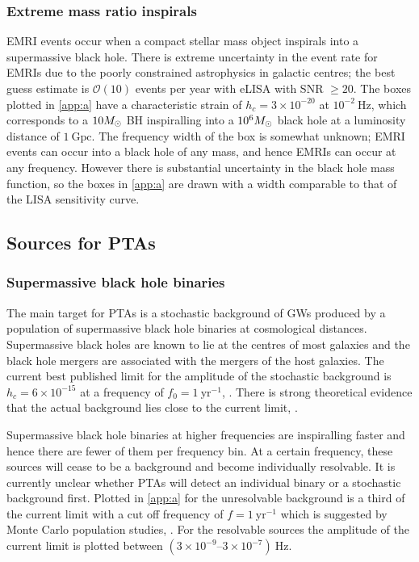 {\subsubsection{Extreme mass ratio inspirals}
EMRI events occur when a compact stellar mass object inspirals into a supermassive black hole. There is extreme uncertainty in the event rate for EMRIs due to the poorly constrained astrophysics in galactic centres; the best guess estimate is ${\mathcal{O}}(10)$ events per year with eLISA with SNR $\ge 20$. The boxes plotted in \ref{app:a} have a characteristic strain of $h_{c}=3\times 10^{-20}$ at $10^{-2}~\mathrm{Hz}$, which corresponds to a $10M_{ \odot }$ BH inspiralling into a $10^{6}M_{ \odot }$ black hole at a luminosity distance of $1~\mathrm{Gpc}$. The frequency width of the box is somewhat unknown; EMRI events can occur into a black hole of any mass, and hence EMRIs can occur at any frequency. However there is substantial uncertainty in the black hole mass function, so the boxes in \ref{app:a} are drawn with a width comparable to that of the LISA sensitivity curve.




\subsection{Sources for PTAs}

\subsubsection{Supermassive black hole binaries}
The main target for PTAs is a stochastic background of GWs produced by a population of supermassive black hole binaries at cosmological distances. Supermassive black holes are known to lie at the centres of most galaxies and the black hole mergers are associated with the mergers of the host galaxies. The current best published limit for the amplitude of the stochastic background is $h_{c} = 6\times 10^{-15}$ at a frequency of $f_{0}=1~\mathrm{yr}^{-1}$, \cite{Haasteren}. There is strong theoretical evidence that the actual background lies close to the current limit, \cite{Sesana-2012}. 

Supermassive black hole binaries at higher frequencies are inspiralling faster and hence there are fewer of them per frequency bin. At a certain frequency, these sources will cease to be a background and become individually resolvable. It is currently unclear whether PTAs will detect an individual binary or a stochastic background first. Plotted in \ref{app:a} for the unresolvable background is a third of the current limit with a cut off frequency of $f=1~\mathrm{yr}^{-1}$ which is suggested by Monte Carlo population studies, \cite{SesanaVecchioColancino}. For the resolvable sources the amplitude of the current limit is plotted between $\left(3\times 10^{-9}\right.$--$\left.3\times 10^{-7}\right)~\mathrm{Hz}$.




}
